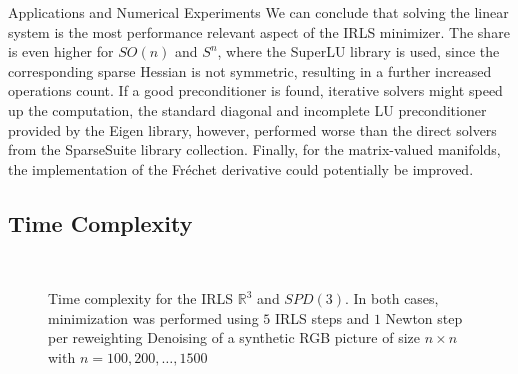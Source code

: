 \begin{chapter}{Applications and Numerical Experiments}
We can conclude that solving the linear system is the most performance relevant aspect of the IRLS minimizer. The share is even higher for $SO(n)$ and $S^n$, where the SuperLU library is used, 
since the corresponding sparse Hessian is not symmetric, resulting in a further increased operations count. If a good preconditioner is found, iterative solvers might speed up the computation, 
the standard diagonal and incomplete LU preconditioner provided by the Eigen library, however, performed worse than the direct solvers from the SparseSuite library collection. Finally, for
the matrix-valued manifolds, the implementation of the Fr\'{e}chet derivative could potentially be improved.

\subsection{Time Complexity}
\label{sub:TimeComplexity}
\begin{figure}[h!]
    \centering
    \\
    \caption[Time complexity IRLS $\mathbb{R}^3$ and $SPD(3)$]{Time complexity for the IRLS $\mathbb{R}^3$ and $SPD(3)$. In both cases, minimization was performed using $5$ IRLS steps and $1$ Newton step per
    reweighting
	 Denoising of a synthetic RGB picture of size $n\times n$ with $n=100, 200, \ldots, 1500$
}
\end{figure}
\end{chapter}
